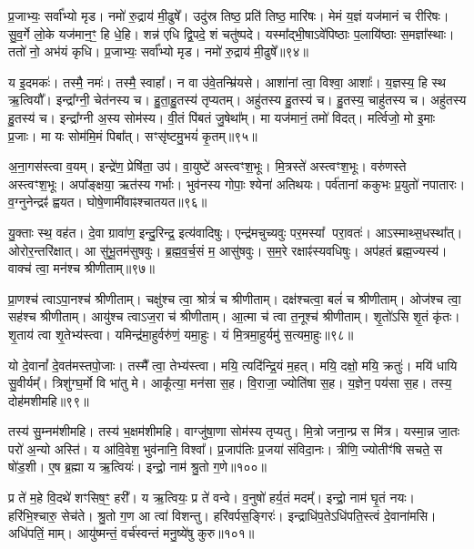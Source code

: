 प्र॒जाभ्यः॒ सर्वा᳚भ्यो मृड।
नमो॑ रु॒द्राय॑ मी॒ढुषे᳚।
उदु॑स्र तिष्ठ॒ प्रति॑ तिष्ठ॒ मारि॑षः।
मेमं य॒ज्ञं यज॑मानं च रीरिषः।
सु॒व॒र्गे लो॒के यज॑मान॒ꣳ॒ हि धे॒हि।
शन्न॑ एधि द्वि॒पदे॒ शं चतु॑ष्पदे।
यस्मा᳚द्भी॒षा\-ऽवे॑पिष्ठाः प॒लायि॑ष्ठाः स॒मज्ञा᳚स्थाः।
ततो॑ नो॒ अभ॑यं कृधि।
प्र॒जाभ्यः॒ सर्वा᳚भ्यो मृड।
नमो॑ रु॒द्राय॑ मी॒ढुषे᳚॥९४॥

य इ॒दमकः॑।
तस्मै॒ नमः॑।
तस्मै॒ स्वाहा᳚।
न वा उ॑वे॒तन्म्रि॑यसे।
आशा॑नां त्वा॒ विश्वा॒ आशाः᳚।
य॒ज्ञस्य॒ हि स्थ ऋ॒त्वियौ᳚।
इन्द्रा᳚ग्नी॒ चेत॑नस्य च।
हु॒ता॒हु॒तस्य॑ तृप्यतम्।
अहु॑तस्य हु॒तस्य॑ च।
हु॒तस्य॒ चाहु॑तस्य च।
अहु॑तस्य हु॒तस्य॑ च।
इन्द्रा᳚ग्नी अ॒स्य सोम॑स्य।
वी॒तं पि॑बतं जु॒षेथा᳚म्।
मा यज॑मानं॒ तमो॑ विदत्।
मर्त्विजो॒ मो इ॒माः प्र॒जाः।
मा यः सोम॑मि॒मं पिबा᳚त्।
सꣳसृ॑ष्टमु॒भयं॑ कृ॒तम्॥९५॥\anuvakamend[कृ॒धि॒ मी॒ढुषे\-ऽहु॑तस्य च स॒प्त च॑]

अ॒ना॒गस॑स्त्वा व॒यम्।
इन्द्रे॑ण॒ प्रेषि॑ता॒ उप॑।
वा॒युष्टे॑ अस्त्वꣳश॒भूः।
मि॒त्रस्ते॑ अस्त्वꣳश॒भूः।
वरु॑णस्ते अस्त्वꣳश॒भूः।
अपा᳚ङ्क्षया॒ ऋत॑स्य गर्भाः।
भुव॑नस्य गोपाः॒ श्येना॑ अतिथयः।
पर्व॑तानां ककुभः प्र॒युतो॑ नपातारः।
व॒ग्नुनेन्द्रꣴ॑ ह्वयत।
घोषे॒णामी॑वाꣴश्चातयत॥९६॥

यु॒क्ताः स्थ॒ वह॑त।
दे॒वा ग्रावा॑ण॒ इन्दु॒रिन्द्र॒ इत्य॑वादिषुः।
एन्द्र॑मचुच्यवुः पर॒मस्या᳚ परा॒वतः॑।
आऽस्माथ्स॒धस्था᳚त्।
ओरोर॒न्तरि॑क्षात्।
आ सु॑भू॒तम॑सुषवुः।
ब्र॒ह्म॒व॒र्च॒सं म॒ आसु॑षवुः।
स॒म॒रे रक्षाꣴ॑स्यवधिषुः।
अप॑हतं ब्रह्म॒ज्यस्य॑।
वाक्च॑ त्वा॒ मन॑श्च श्रीणीताम्॥९७॥

प्रा॒णश्च॑ त्वा\-ऽपा॒नश्च॑ श्रीणीताम्।
चक्षु॑श्च त्वा॒ श्रोत्रं॑ च श्रीणीताम्।
दक्ष॑श्चत्वा॒ बलं॑ च श्रीणीताम्।
ओज॑श्च त्वा॒ सह॑श्च श्रीणीताम्।
आयु॑श्च त्वा\-ऽज॒रा च॑ श्रीणीताम्।
आ॒त्मा च॑ त्वा त॒नूश्च॑ श्रीणीताम्।
शृ॒तो॑ऽसि शृ॒तं कृ॑तः।
शृ॒ताय॑ त्वा शृ॒तेभ्य॑स्त्वा।
यमिन्द्र॑मा॒हुर्वरु॑णं॒ यमा॒हुः।
यं मि॒त्रमा॒हुर्यमु॑ स॒त्यमा॒हुः॥९८॥

यो दे॒वानां᳚ दे॒वत॑मस्तपो॒जाः।
तस्मै᳚ त्वा॒ तेभ्य॑स्त्वा।
मयि॒ त्यदि॑न्द्रि॒यं म॒हत्।
मयि॒ दक्षो॒ मयि॒ क्रतुः॑।
मयि॑ धायि सु॒वीर्यम्᳚।
त्रिशु॑ग्घ॒र्मो वि भा॑तु मे।
आकू᳚त्या॒ मन॑सा स॒ह।
वि॒राजा॒ ज्योति॑षा स॒ह।
य॒ज्ञेन॒ पय॑सा स॒ह।
तस्य॒ दोह॑मशीमहि॥९९॥

तस्य॑ सु॒म्नम॑शीमहि।
तस्य॑ भ॒क्षम॑शीमहि।
वाग्जु॑षा॒णा सोम॑स्य तृप्यतु।
मि॒त्रो जना॒न्प्र स मि॑त्र।
यस्मा॒न्न जा॒तः परो॑ अ॒न्यो अस्ति॑।
य आ॑वि॒वेश॒ भुव॑नानि॒ विश्वा᳚।
प्र॒जाप॑तिः प्र॒जया॑ संविदा॒नः।
त्रीणि॒ ज्योतीꣳ॑षि सचते॒ स षो॑ड॒शी।
ए॒ष ब्र॒ह्मा य ऋ॒त्वियः॑।
इन्द्रो॒ नाम॑ श्रु॒तो ग॒णे॥१००॥

प्र ते॑ म॒हे वि॒दथे॑ शꣳसिष॒ꣳ॒ हरी᳚।
य ऋ॒त्वियः॒ प्र ते॑ वन्वे।
व॒नुषो॑ हर्य॒तं मदम्᳚।
इन्द्रो॒ नाम॑ घृ॒तं नयः।
हरि॑भि॒श्चारु॒ सेच॑ते।
श्रु॒तो ग॒ण आ त्वा॑ विशन्तु।
हरि॑वर्पस॒ङ्गिरः॑।
इन्द्राधि॑प॒ते\-ऽधि॑पति॒स्त्वं दे॒वाना॑मसि।
अधि॑पतिं॒ माम्।
आयु॑ष्मन्तं॒ वर्च॑स्वन्तं मनु॒ष्ये॑षु कुरु॥१०१॥

